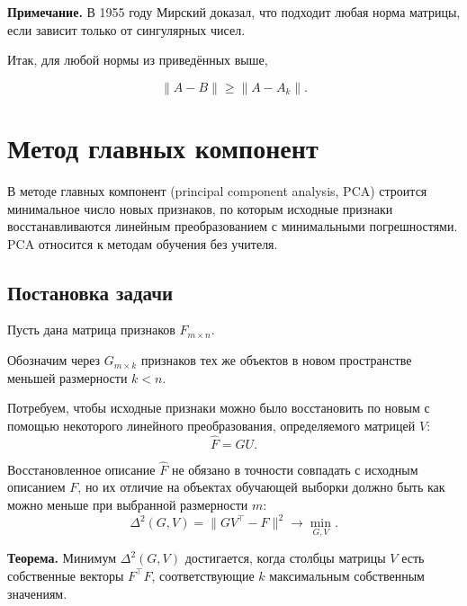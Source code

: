 \documentclass[11pt,a4paper]{article}
\renewcommand{\linethickness}{0.1ex}
\begin{document}
\textbf{Примечание.} В 1955 году Мирский доказал, что подходит любая
норма матрицы, если зависит только от сингулярных чисел.

Итак, для любой нормы из приведённых выше,

\[ \|A - B\| \ge \|A - A_k\|. \]


    \hypertarget{ux43cux435ux442ux43eux434-ux433ux43bux430ux432ux43dux44bux445-ux43aux43eux43cux43fux43eux43dux435ux43dux442}{%
\section{Метод главных
компонент}\label{ux43cux435ux442ux43eux434-ux433ux43bux430ux432ux43dux44bux445-ux43aux43eux43cux43fux43eux43dux435ux43dux442}}

В методе главных компонент (principal component analysis, PCA) строится
минимальное число новых признаков, по которым исходные признаки
восстанавливаются линейным преобразованием с минимальными погрешностями.
PCA относится к методам обучения без учителя.

    \hypertarget{ux43fux43eux441ux442ux430ux43dux43eux432ux43aux430-ux437ux430ux434ux430ux447ux438}{%
\subsection{Постановка
задачи}\label{ux43fux43eux441ux442ux430ux43dux43eux432ux43aux430-ux437ux430ux434ux430ux447ux438}}

Пусть дана матрица признаков \(F_{m \times n}\).

Обозначим через \(G_{m \times k}\) признаков тех же объектов в новом
пространстве меньшей размерности \(k < n\).

Потребуем, чтобы исходные признаки можно было восстановить по новым с
помощью некоторого линейного преобразования, определяемого матрицей
\(V\): \[ \hat{F} = G U. \]

Восстановленное описание \(\hat{F}\) не обязано в точности совпадать с
исходным описанием \(F\), но их отличие на объектах обучающей выборки
должно быть как можно меньше при выбранной размерности \(m\):
\[ \Delta^2(G, V) = \|G V^\top - F\|^2 \rightarrow \min_{G, V}. \]

\textbf{Теорема.} Минимум \(\Delta^2(G, V)\) достигается, когда столбцы
матрицы \(V\) есть собственные векторы \(F^\top F\), соответствующие
\(k\) максимальным собственным значениям.
\end{document}
